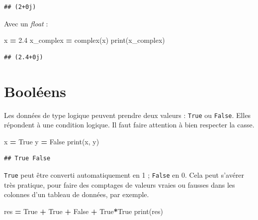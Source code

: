 \documentclass[12pt,]{book}
\newenvironment{Shaded}{\begin{snugshade}}{\end{snugshade}}
\newcommand{\FloatTok}[1]{\textcolor[rgb]{0.00,0.00,0.81}{#1}}
\newcommand{\VariableTok}[1]{\textcolor[rgb]{0.00,0.00,0.00}{#1}}
\newcommand{\OperatorTok}[1]{\textcolor[rgb]{0.81,0.36,0.00}{\textbf{#1}}}
\newcommand{\BuiltInTok}[1]{#1}
\newcommand{\NormalTok}[1]{#1}
\numberwithin{equation}{section}
\numberwithin{countremarque}{section}
\begin{document}
\begin{lstlisting}
## (2+0j)
\end{lstlisting}

Avec un \emph{float} :

\begin{Shaded}
\begin{Highlighting}[]
\NormalTok{x }\OperatorTok{=} \FloatTok{2.4}
\NormalTok{x_complex }\OperatorTok{=} \BuiltInTok{complex}\NormalTok{(x)}
\BuiltInTok{print}\NormalTok{(x_complex)}
\end{Highlighting}
\end{Shaded}

\begin{lstlisting}
## (2.4+0j)
\end{lstlisting}

\section{Booléens}\label{booleens}

Les données de type logique peuvent prendre deux valeurs : \texttt{True}
ou \texttt{False}. Elles répondent à une condition logique. Il faut
faire attention à bien respecter la casse.

\begin{Shaded}
\begin{Highlighting}[]
\NormalTok{x }\OperatorTok{=} \VariableTok{True}
\NormalTok{y }\OperatorTok{=} \VariableTok{False}
\BuiltInTok{print}\NormalTok{(x, y)}
\end{Highlighting}
\end{Shaded}

\begin{lstlisting}
## True False
\end{lstlisting}

\texttt{True} peut être converti automatiquement en 1 ; \texttt{False}
en 0. Cela peut s'avérer très pratique, pour faire des comptages de
valeurs vraies ou fausses dans les colonnes d'un tableau de données, par
exemple.

\begin{Shaded}
\begin{Highlighting}[]
\NormalTok{res }\OperatorTok{=} \VariableTok{True} \OperatorTok{+} \VariableTok{True} \OperatorTok{+} \VariableTok{False} \OperatorTok{+} \VariableTok{True}\OperatorTok{*}\VariableTok{True}
\BuiltInTok{print}\NormalTok{(res)}
\end{Highlighting}
\end{Shaded}
\end{document}
